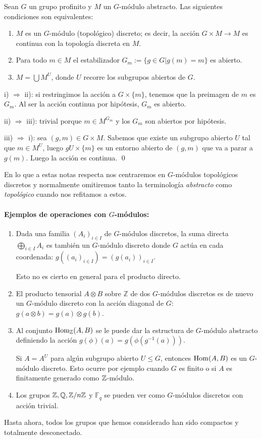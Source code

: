 \documentclass[a4paper,12pt, leqno]{report}
\begin{document}
\begin{prop}
Sean $G$ un grupo profinito y $M$ un $G$-módulo abstracto. Las siguientes condiciones son equivalentes:
\begin{enumerate}[label= \roman*)]
	\item $M$ es un $G$-módulo (topológico) discreto; es decir, la acción $G \times M \rightarrow M$ es continua con la topología discreta en $M$.
	\item Para todo $m \in M$ el estabilizador $G_m:=\{g \in G|g(m)=m\}$ es abierto.
	\item $M=\bigcup M^U$, donde $U$ recorre los subgrupos abiertos de $G$. 
\end{enumerate}
\end{prop}
\begin{dem}
	i) $\Rightarrow$ ii): si restringimos la acción a $G \times \{m\}$, tenemos que la preimagen de $m$ es $G_m$. Al ser la acción continua por hipótesis, $G_m$ es abierto. 
	
	ii) $\Rightarrow$ iii): trivial porque $m \in M^{G_m}$ y los $G_m$ son abiertos por hipótesis.
	
	iii) $\Rightarrow$ i): sea $(g,m)\in G \times M$. Sabemos que existe un subgrupo abierto $U$ tal que $m \in M^U$, luego $gU \times \{m\}$ es un entorno abierto de $(g,m)$ que va a parar a $g(m)$. Luego la acción es continua. \qed
\end{dem}
En lo que a estas notas respecta nos centraremos en $G$-módulos topológicos discretos y normalmente omitiremos tanto la terminología \textit{abstracto} como \textit{topológico} cuando nos refitamos a estos.
\paragraph*{Ejemplos de operaciones con $G$-módulos:}
\begin{enumerate}
	\item Dada una familia $(A_i)_{i\in I}$ de $G$-módulos discretos, la suma directa $\bigoplus_{i \in I}A_i$ es también un $G$-módulo discreto donde $G$ actúa en cada coordenada: $g((a_i)_{i \in I})=(g(a_i))_{i \in I}$. 
	
	Esto no es cierto en general para el producto directo. 
	
	\item El producto tensorial $A \otimes B$ sobre $\mathbb{Z}$ de dos $G$-módulos discretos es de nuevo un $G$-módulo discreto con la acción diagonal de $G$: $g(a \otimes b)=g(a) \otimes g(b)$.
	\item Al conjunto $\mathrm{Hom}_{\mathbb{Z}}(A,B)$ se le puede dar la estructura de $G$-módulo abstracto definiendo la acción $g(\phi)(a)=g(\phi(g^{-1}(a)))$. 
	
	Si $A=A^U$ para algún subgrupo abierto $U\leq G$, entonces $\mathrm{Hom} (A,B)$ es un $G$-módulo discreto. Esto ocurre por ejemplo cuando $G$ es finito o si $A$ es finitamente generado como $\mathbb{Z}$-módulo. 
	\item Los grupos $\mathbb{Z}, \mathbb{Q}, \mathbb{Z}/n\mathbb{Z}$ y $\mathbb{F}_q$ se pueden ver como $G$-módulos discretos con acción trivial. 
\end{enumerate}	
Hasta ahora, todos los grupos que hemos considerado han sido compactos y totalmente desconectado. 
\end{document}
